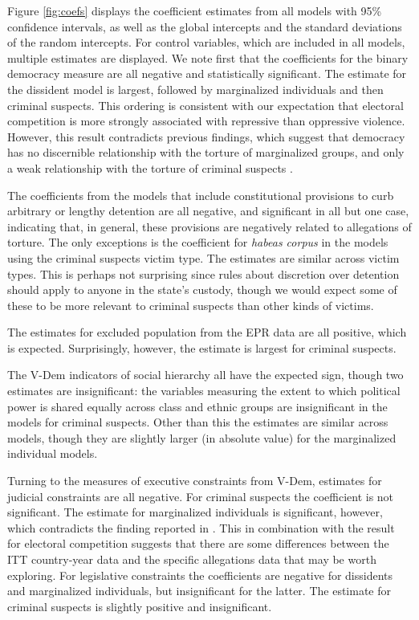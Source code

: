 \documentclass[11pt]{article}
\begin{document}
Figure \ref{fig:coefs} displays the coefficient estimates from all models with 95\% confidence intervals, as well as the global intercepts and the standard deviations of the random intercepts. For control variables, which are included in all models, multiple estimates are displayed. We note first that the coefficients for the binary democracy measure are all negative and statistically significant. The estimate for the dissident model is largest, followed by marginalized individuals and then criminal suspects. This ordering is consistent with our expectation that electoral competition is more strongly associated with repressive than oppressive violence. However, this result contradicts previous findings, which suggest that democracy has no discernible relationship with the torture of marginalized groups, and only a weak relationship with the torture of criminal suspects \citep{Haschke2018,JacksonHillHall2018}.  

The coefficients from the models that include constitutional provisions to curb arbitrary or lengthy detention are all negative, and significant in all but one case, indicating that, in general, these provisions are negatively related to allegations of torture. The only exceptions is the coefficient for {\em habeas corpus} in the models using the criminal suspects victim type. The estimates are similar across victim types. This is perhaps not surprising since rules about discretion over detention should apply to anyone in the state's custody, though we would expect some of these to be more relevant to criminal suspects than other kinds of victims.      

The estimates for excluded population from the EPR data are all positive, which is expected. Surprisingly, however, the estimate is largest for criminal suspects. 

The V-Dem indicators of social hierarchy all have the expected sign, though two estimates are insignificant: the variables measuring the extent to which political power is shared equally across class and ethnic groups are insignificant in the models for criminal suspects. Other than this the estimates are similar across models, though they are slightly larger (in absolute value) for the marginalized individual models.   

Turning to the measures of executive constraints from V-Dem, estimates for judicial constraints are all negative. For criminal suspects the coefficient is not significant. The estimate for marginalized individuals is significant, however, which contradicts the finding reported in \citet{JacksonHillHall2018}. This in combination with the result for electoral competition suggests that there are some differences between the ITT country-year data and the specific allegations data that may be worth exploring. For legislative constraints the coefficients are negative for dissidents and marginalized individuals, but insignificant for the latter. The estimate for criminal suspects is slightly positive and insignificant. 
\end{document}
